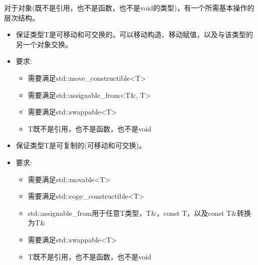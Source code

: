 
对于对象(既不是引用，也不是函数，也不是void的类型)，有一个所需基本操作的层次结构。


\begin{itemize}
\item
保证类型T是可移动和可交换的。可以移动构造、移动赋值，以及与该类型的另一个对象交换。

\item
要求:
\begin{itemize}
\item
需要满足std::move\_constructible<T>

\item
需要满足std::assignable\_from<T\&, T>

\item
需要满足std::swappable<T>

\item
T既不是引用，也不是函数，也不是void
\end{itemize}
\end{itemize}


\begin{itemize}
\item
保证类型T是可复制的(可移动和可交换)。

\item
要求:
\begin{itemize}
\item
需要满足std::movable<T>

\item
需要满足std::copy\_constructible<T>

\item
std::assignable\_from用于任意T类型，T\&，const T，以及const T\&转换为T\&

\item
需要满足std::swappable<T>

\item
T既不是引用，也不是函数，也不是void
\end{itemize}
\end{itemize}


